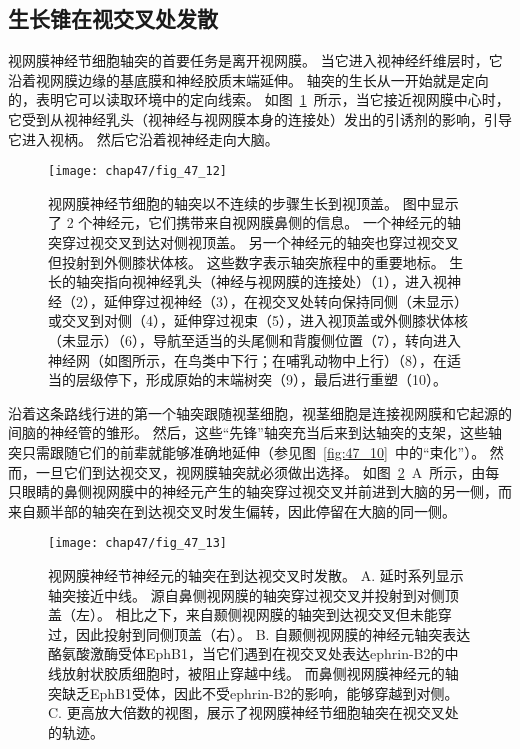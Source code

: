 \subsection{生长锥在视交叉处发散}

视网膜神经节细胞轴突的首要任务是离开视网膜。
当它进入视神经纤维层时，它沿着视网膜边缘的基底膜和神经胶质末端延伸。
轴突的生长从一开始就是定向的，表明它可以读取环境中的定向线索。
如图~\ref{fig:47_12}~所示，当它接近视网膜中心时，它受到从视神经乳头（视神经与视网膜本身的连接处）发出的引诱剂的影响，引导它进入视柄。
然后它沿着视神经走向大脑。


\begin{figure}[htbp]
	\centering
	\texttt{[image: chap47/fig\_47\_12]}
	\caption{视网膜神经节细胞的轴突以不连续的步骤生长到视顶盖。
		图中显示了 2 个神经元，它们携带来自视网膜鼻侧的信息。
		一个神经元的轴突穿过视交叉到达对侧视顶盖。
		另一个神经元的轴突也穿过视交叉但投射到外侧膝状体核。
		这些数字表示轴突旅程中的重要地标。
		生长的轴突指向视神经乳头（神经与视网膜的连接处）（1），进入视神经（2），延伸穿过视神经（3），在视交叉处转向保持同侧（未显示）或交叉到对侧（4），延伸穿过视束（5），进入视顶盖或外侧膝状体核（未显示）（6），导航至适当的头尾侧和背腹侧位置（7），转向进入神经网（如图所示，在鸟类中下行；在哺乳动物中上行）（8），在适当的层级停下，形成原始的末端树突（9），最后进行重塑（10）。}
	\label{fig:47_12}
\end{figure}


沿着这条路线行进的第一个轴突跟随视茎细胞，视茎细胞是连接视网膜和它起源的间脑的神经管的雏形。
然后，这些“先锋”轴突充当后来到达轴突的支架，这些轴突只需跟随它们的前辈就能够准确地延伸（参见图~\ref{fig:47_10}~中的“束化”）。
然而，一旦它们到达视交叉，视网膜轴突就必须做出选择。
如图~\ref{fig:47_13}~A~所示，由每只眼睛的鼻侧视网膜中的神经元产生的轴突穿过视交叉并前进到大脑的另一侧，而来自颞半部的轴突在到达视交叉时发生偏转，因此停留在大脑的同一侧。


\begin{figure}[htbp]
	\centering
	\texttt{[image: chap47/fig\_47\_13]}
	\caption{视网膜神经节神经元的轴突在到达视交叉时发散。
		A. 延时系列显示轴突接近中线。
		源自鼻侧视网膜的轴突穿过视交叉并投射到对侧顶盖（左）。
		相比之下，来自颞侧视网膜的轴突到达视交叉但未能穿过，因此投射到同侧顶盖（右）。
		B. 自颞侧视网膜的神经元轴突表达酪氨酸激酶受体EphB1，当它们遇到在视交叉处表达ephrin-B2的中线放射状胶质细胞时，被阻止穿越中线。
		而鼻侧视网膜神经元的轴突缺乏EphB1受体，因此不受ephrin-B2的影响，能够穿越到对侧。
		C. 更高放大倍数的视图，展示了视网膜神经节细胞轴突在视交叉处的轨迹。}
	\label{fig:47_13}
\end{figure}


